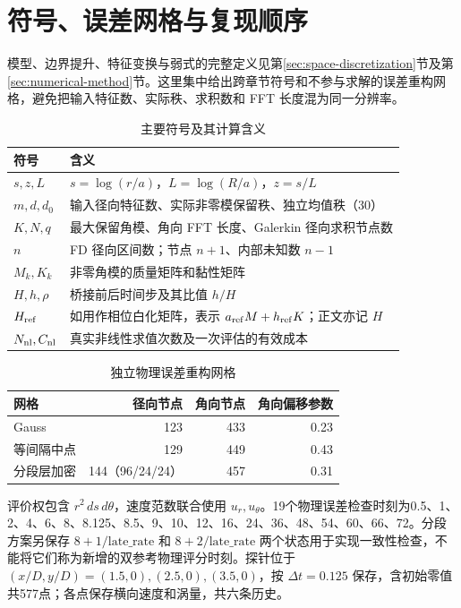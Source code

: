 \appendix
\section{符号、误差网格与复现顺序}\label{sec:app-setup}

模型、边界提升、特征变换与弱式的完整定义见第\ref{sec:space-discretization}节及第\ref{sec:numerical-method}节。这里集中给出跨章节符号和不参与求解的误差重构网格，避免把输入特征数、实际秩、求积数和 FFT 长度混为同一分辨率。

\begin{table}[!htbp]
\centering\small
\caption{主要符号及其计算含义}
\begin{tabularx}{\linewidth}{@{}lX@{}}
\toprule
符号 & 含义 \\
\midrule
$s,z,L$ & $s=\log(r/a)$，$L=\log(R/a)$，$z=s/L$ \\
$m,d,d_0$ & 输入径向特征数、实际非零模保留秩、独立均值秩（30） \\
$K,N,q$ & 最大保留角模、角向 FFT 长度、Galerkin 径向求积节点数 \\
$n$ & FD 径向区间数；节点 $n+1$、内部未知数 $n-1$ \\
$M_k,K_k$ & 非零角模的质量矩阵和黏性矩阵 \\
$H,h,\rho$ & 桥接前后时间步及其比值 $h/H$ \\
$H_{\rm ref}$ & 如用作相位白化矩阵，表示 $a_{\rm ref}M+h_{\rm ref}K$；正文亦记 $H$ \\
$N_{\rm nl},C_{\rm nl}$ & 真实非线性求值次数及一次评估的有效成本 \\
\bottomrule
\end{tabularx}
\end{table}

\begin{table}[!htbp]
\centering\small
\caption{独立物理误差重构网格}
\label{tab:app-score-grids}
\begin{tabularx}{\linewidth}{@{}Xrrr@{}}
\toprule
网格 & 径向节点 & 角向节点 & 角向偏移参数 \\
\midrule
Gauss & 123 & 433 & 0.23 \\
等间隔中点 & 129 & 449 & 0.43 \\
分段层加密 & 144（96/24/24） & 457 & 0.31 \\
\bottomrule
\end{tabularx}
\end{table}

评价权包含 $r^2\,ds\,d\theta$，速度范数联合使用 $u_r,u_\theta$。19个物理误差检查时刻为0.5、1、2、4、6、8、8.125、8.5、9、10、12、16、24、36、48、54、60、66、72。分段方案另保存 $8+1/\mathrm{late\_rate}$ 和 $8+2/\mathrm{late\_rate}$ 两个状态用于实现一致性检查，不能将它们称为新增的双参考物理评分时刻。探针位于 $(x/D,y/D)=(1.5,0),(2.5,0),(3.5,0)$，按 $\Delta t=0.125$ 保存，含初始零值共577点；各点保存横向速度和涡量，共六条历史。


